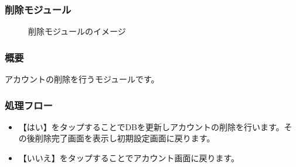 \documentclass[a4j]{jarticle}
\begin{document}
\subsubsection{削除モジュール\label{削除}} %
\begin{figure}[H]
    \begin{center}
    \caption {削除モジュールのイメージ}
    \label{functionselection}
    \end{center}
\end{figure}
\subsubsection*{概要}
アカウントの削除を行うモジュールです。
\subsubsection*{処理フロー}
\begin{itemize}
\item 【はい】をタップすることでDBを更新しアカウントの削除を行います。その後削除完了画面を表示し初期設定画面に戻ります。
\item 【いいえ】をタップすることでアカウント画面に戻ります。
\end{itemize}
\end{document}
